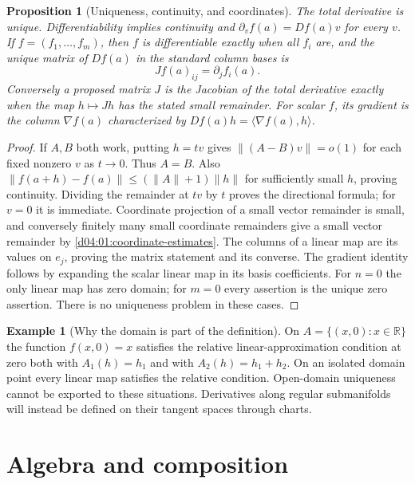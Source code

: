 \documentclass[11pt,oneside,openany]{book}
\newtheorem{proposition}[theorem]{Proposition}
\theoremstyle{definition}
\newtheorem{example}[theorem]{Example}
\theoremstyle{remark}
\newcommand{\R}{\mathbb R}
\newcommand{\norm}[1]{\lVert#1\rVert}
\newcommand{\ip}[2]{\langle#1,#2\rangle}
\newcommand{\family}[1]{}
\begin{document}
\begin{proposition}[Uniqueness, continuity, and coordinates]\label{d04:02:derivative-bridge}
The total derivative is unique. Differentiability implies continuity and
$\partial_vf(a)=Df(a)v$ for every $v$. If $f=(f_1,\ldots,f_m)$,
then $f$ is differentiable exactly when all $f_i$ are, and the unique matrix
of $Df(a)$ in the standard column bases is
\[
 Jf(a)_{ij}=\partial_jf_i(a).
\]
Conversely a proposed matrix $J$ is the Jacobian of the total derivative
exactly when the map $h\mapsto Jh$ has the stated small remainder.
For scalar $f$, its gradient is the column $\nabla f(a)$ characterized by
$Df(a)h=\ip{\nabla f(a)}{h}$.
\end{proposition}
\begin{proof}
If $A,B$ both work, putting $h=tv$ gives
$\norm{(A-B)v}=o(1)$ for each fixed nonzero $v$ as $t\to0$.
Thus $A=B$. Also
$\norm{f(a+h)-f(a)}\leq(\norm{A}+1)\norm{h}$ for sufficiently
small $h$, proving continuity. Dividing the remainder at $tv$ by $t$ proves
the directional formula; for $v=0$ it is immediate. Coordinate projection
of a small vector remainder is small, and conversely finitely many small
coordinate remainders give a small vector remainder by
\cref{d04:01:coordinate-estimates}. The columns of a linear map are its
values on $e_j$, proving the matrix statement and its converse. The gradient
identity follows by expanding the scalar linear map in its basis coefficients.
For $n=0$ the only linear map has zero domain; for $m=0$ every assertion is
the unique zero assertion. There is no uniqueness problem in these cases.
\end{proof}

\begin{example}[Why the domain is part of the definition]\label{d04:02:relative-derivative}
On $A=\{(x,0):x\in\R\}$ the function $f(x,0)=x$ satisfies the relative
linear-approximation condition at zero both with $A_1(h)=h_1$ and with
$A_2(h)=h_1+h_2$. On an isolated domain point every linear map satisfies
the relative condition. Open-domain uniqueness cannot be exported to these
situations. Derivatives along regular submanifolds will instead be defined
on their tangent spaces through charts.
\end{example}

\section{Algebra and composition}
\family{K04.02.05}\family{K04.02.06}\family{K04.02.07}
\end{document}
